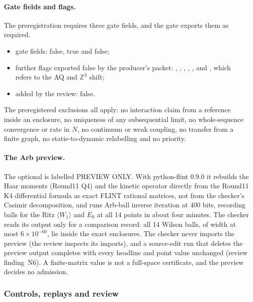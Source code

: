 \paragraph{Gate fields and flags.}
The preregistration requires three gate fields, and the gate exports them as
required.
\begin{itemize}\raggedright
\item gate fields:  false,
  true and  false;
\item further flags exported false by the producer's packet:
 , ,
 , ,
 ,  and
 , which refers to the AQ and
 $\mathbb Z^3$ shift;
\item added by the review:  false.
\end{itemize}
The preregistered
exclusions all apply: no interaction claim from a reference inside an
enclosure, no uniqueness of any subsequential limit, no whole-sequence
convergence or rate in $N$, no continuum or weak coupling, no transfer from a
finite graph, no static-to-dynamic relabelling and no priority.

\paragraph{The Arb preview.}
The optional  is labelled PREVIEW ONLY. With
python-flint 0.9.0 \cite{flint} it rebuilds the Haar moments (Round11 Q4) and
the kinetic operator directly from the Round11 K4 differential formula as
exact FLINT rational matrices, not from the checker's Casimir decomposition,
and runs Arb-ball inverse iteration at 400 bits, recording balls for the Ritz
$\langle W_1\rangle$ and $E_0$ at all 14 points in about four minutes. The
checker reads its output only for a comparison record: all 14 Wilson balls,
of width at most $6\times10^{-60}$, lie inside the exact enclosures. The
checker never imports the preview (the review inspects its imports), and a
source-edit run that deletes the preview output completes with every headline
and point value unchanged (review finding~N6). A finite-matrix value is not a
full-space certificate, and the preview decides no admission.

\subsubsection{Controls, replays and review}
\label{sec:az2-evidence}
